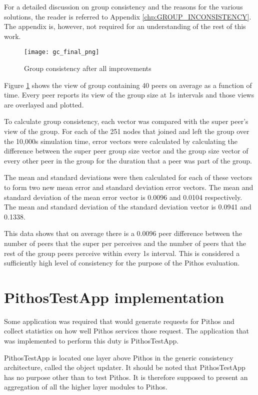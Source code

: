 For a detailed discussion on group consistency and the reasons for the various solutions, the reader is referred to Appendix \ref{chp:GROUP_INCONSISTENCY}. The appendix is, however, not required for an understanding of the rest of this work.

\begin{figure}[htbp]
 \centering
 \texttt{[image: gc\_final\_png]}
 \caption{Group consistency after all improvements}
 \label{fig_gc_final}
\end{figure}
%
Figure \ref{fig_gc_final} shows the view of group containing 40 peers on average as a function of time. Every peer reports its view of the group size at 1s intervals and those views are overlayed and plotted.

To calculate group consistency, each vector was compared with the super peer's view of the group. For each of the 251 nodes that joined and left the group over the 10,000s simulation time, error vectors were calculated by calculating the difference between the super peer group size vector and the group size vector of every other peer in the group for the duration that a peer was part of the group.

The mean and standard deviations were then calculated for each of these vectors to form two new mean error and standard deviation error vectors. The mean and standard deviation of the mean error vector is 0.0096 and 0.0104 respectively. The mean and standard deviation of the standard deviation vector is 0.0941 and 0.1338.

This data shows that on average there is a 0.0096 peer difference between the number of peers that the super per perceives and the number of peers that the rest of the group peers perceive within every 1s interval. This is considered a sufficiently high level of consistency for the purpose of the Pithos evaluation.

\section{PithosTestApp implementation}
\label{pithostestapp}

Some application was required that would generate requests for Pithos and collect statistics on how well Pithos services those request. The application that was implemented to perform this duty is PithosTestApp.

PithosTestApp is located one layer above Pithos in the generic consistency architecture, called the object updater. It should be noted that PithosTestApp has no purpose other than to test Pithos. It is therefore supposed to present an aggregation of all the higher layer modules to Pithos.

